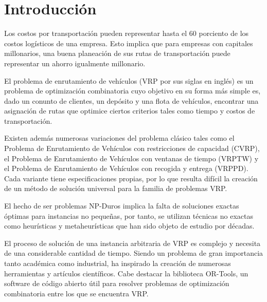 \chapter*{Introducción}\label{chapter:introduction}

\qquad 
Los costos por transportación pueden representar hasta el 60 porciento de los costos logísticos de una empresa. Esto implica que para empresas con capitales millonarios, una buena planeación de sus rutas de transportación puede representar un ahorro igualmente millonario.

El problema de enrutamiento de vehículos (VRP por sus siglas en inglés) es un problema de optimización combinatoria cuyo objetivo en su forma más simple es, dado un conunto de clientes, un depósito y una flota de vehículos, encontrar una asignación de rutas que optimice ciertos criterios tales como tiempo y costos de transportación.

Existen además numerosas variaciones del problema clásico tales como el Problema de Enrutamiento de Vehículos con restricciones de capacidad (CVRP), el Problema de Enrutamiento de Vehículos con ventanas de tiempo (VRPTW) y el Problema de Enrutamiento de Vehículos con recogida y entrega (VRPPD). Cada variante tiene especificaciones propias, por lo que resulta difícil la creación de un método de solución universal para la familia de problemas VRP.

El hecho de ser problemas NP-Duros implica la falta de soluciones exactas óptimas para instancias no pequeñas, por tanto, se utilizan técnicas no exactas como heurísticas y metaheurísticas que han sido objeto de estudio por décadas.

El proceso de solución de una instancia arbitraria de VRP es complejo y necesita de una considerable cantidad de tiempo. Siendo un problema de gran importancia tanto académica como industrial, ha inspirado la creación de numerosas herramientas y artículos científicos. Cabe destacar la biblioteca OR-Tools, un software de código abierto útil para resolver problemas de optimización combinatoria entre los que se encuentra VRP.


